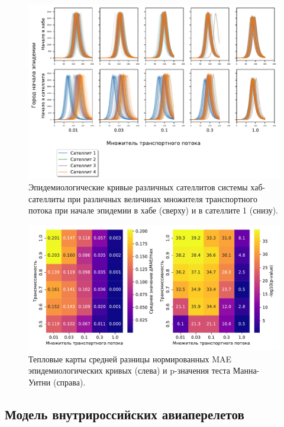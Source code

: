 \documentclass[a4paper,12pt]{article} %
\begin{document}
 
 \begin{figure}[H]
    \centering
    \includegraphics[width=\linewidth]{images/diffsatellites_demos.pdf}
    \caption{Эпидемиологические кривые различных сателлитов системы хаб-сателлиты при различных величинах множителя транспортного потока при начале эпидемии в хабе (сверху) и в сателлите 1 (снизу).}
    \label{pic:diffsatellites_demos}
\end{figure}

\begin{figure}[H]
    \centering
    \includegraphics[width=\linewidth]{images/diffsatellites_heatmaps_mann.pdf}
    \caption{Тепловые карты средней разницы нормированных MAE эпидемиологических кривых (слева) и p-значения теста Манна-Уитни (справа).}
    \label{pic:diffsatellites_heatmaps}
\end{figure}

\newpage	
\subsection{Модель внутрироссийских авиаперелетов}
\end{document}

